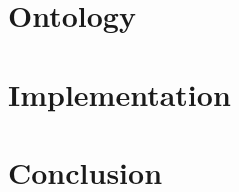 \documentclass[preprint,12pt]{elsarticle}
\begin{document}
\section{Ontology}
\label{Sect:Ontology}

\section{Implementation}
\label{Sect:Implementation}

\section{Conclusion}
\label{Sect:Conclusion}













\end{document}
